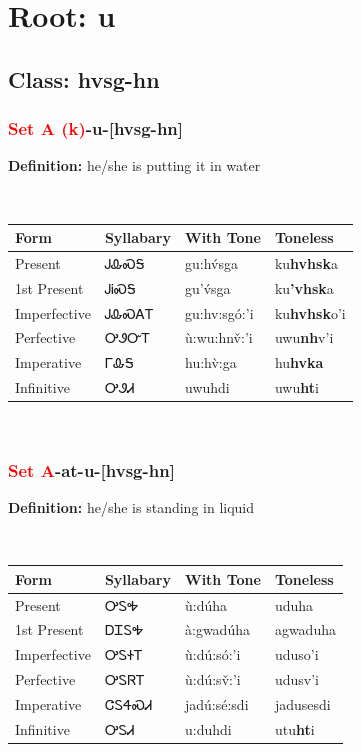 \needspace{4in}
\section*{Root: u}
\nopagebreak
{}
\needspace{3in}
\subsection*{Class: hvsg-hn}
\nopagebreak
\needspace{2in}
\subsubsection*{\textcolor{Red}{Set A (k)}{-}\textbf{u}{-}[hvsg-hn]}
\nopagebreak
\textbf{Definition: } he/she is putting it in water
\\[0.5em]
\begin{tabularx}{\textwidth}{l X X X}%
\toprule%
\textbf{Form}&\textbf{Syllabary}&\textbf{With Tone}&\textbf{Toneless}\\%
\midrule%
Present&ᎫᎲᏍᎦ&gu:hv́sga&ku\textbf{hvhsk}a\\%
1st Present&ᎫᎥᏍᎦ&gu’v́sga&ku\textbf{'vhsk}a\\%
Imperfective&ᎫᎲᏍᎪᎢ&gu:hv:sgó:’i&ku\textbf{hvhsk}o'i\\%
Perfective&ᎤᏭᏅᎢ&ù:wu:hnv̌:’i&uwu\textbf{nh}v'i\\%
Imperative&ᎱᎲᎦ&hu:hv̀:ga&hu\textbf{hvka}\\%
Infinitive&ᎤᏭᏗ&uwuhdi&uwu\textbf{ht}i\\%
\bottomrule%
\end{tabularx}
\\[1em]
\needspace{2in}
\subsubsection*{\textcolor{Red}{Set A}{-}at{-}\textbf{u}{-}[hvsg-hn]}
\nopagebreak
\textbf{Definition: } he/she is standing in liquid
\\[0.5em]
\begin{tabularx}{\textwidth}{l X X X}%
\toprule%
\textbf{Form}&\textbf{Syllabary}&\textbf{With Tone}&\textbf{Toneless}\\%
\midrule%
Present&ᎤᏚᎭ&ù:dúha&uduha\\%
1st Present&ᎠᏆᏚᎭ&à:gwadúha&agwaduha\\%
Imperfective&ᎤᏚᏐᎢ&ù:dú:só:’i&uduso{\textquoteright}i\\%
Perfective&ᎤᏚᏒᎢ&ù:dú:sv̌:’i&udusv{\textquoteright}i\\%
Imperative&ᏣᏚᏎᏍᏗ&jadú:sé:sdi&jadusesdi\\%
Infinitive&ᎤᏚᏗ&u:duhdi&utu\textbf{ht}i\\%
\bottomrule%
\end{tabularx}
\\[1em]